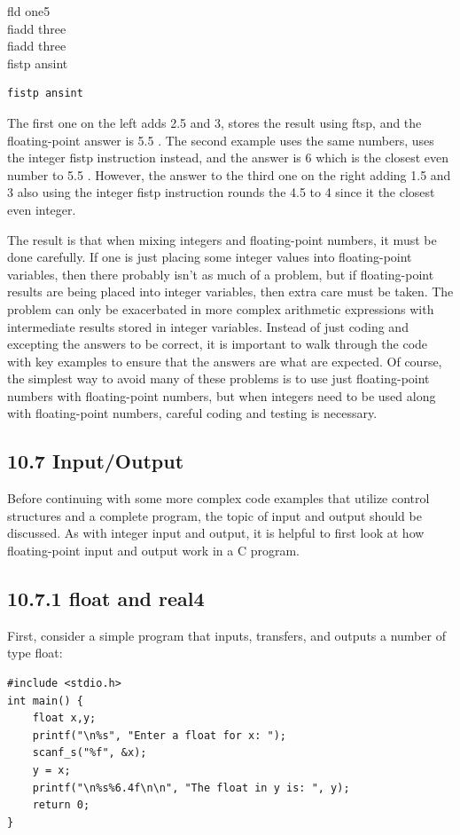 \documentclass[10pt]{book}
\begin{document}
\begin{center}
\begin{center}
\begin{center}
\begin{center}
fld one5\\
fiadd three\\
fiadd three\\
fistp ansint

\begin{verbatim}
fistp ansint
\end{verbatim}

The first one on the left adds 2.5 and 3, stores the result using ftsp, and the floating-point answer is 5.5 . The second example uses the same numbers, uses the integer fistp instruction instead, and the answer is 6 which is the closest even number to 5.5 . However, the answer to the third one on the right adding 1.5 and 3 also using the integer fistp instruction rounds the 4.5 to 4 since it the closest even integer.

The result is that when mixing integers and floating-point numbers, it must be done carefully. If one is just placing some integer values into floating-point variables, then there probably isn't as much of a problem, but if floating-point results are being placed into integer variables, then extra care must be taken. The problem can only be exacerbated in more complex arithmetic expressions with intermediate results stored in integer variables. Instead of just coding and excepting the answers to be correct, it is important to walk through the code with key examples to ensure that the answers are what are expected. Of course, the simplest way to avoid many of these problems is to use just floating-point numbers with floating-point numbers, but when integers need to be used along with floating-point numbers, careful coding and testing is necessary.

\subsection*{10.7 Input/Output}
Before continuing with some more complex code examples that utilize control structures and a complete program, the topic of input and output should be discussed. As with integer input and output, it is helpful to first look at how floating-point input and output work in a C program.

\subsection*{10.7.1 float and real4}
First, consider a simple program that inputs, transfers, and outputs a number of type float:


\begin{verbatim}
#include <stdio.h>
int main() {
    float x,y;
    printf("\n%s", "Enter a float for x: ");
    scanf_s("%f", &x);
    y = x;
    printf("\n%s%6.4f\n\n", "The float in y is: ", y);
    return 0;
}
\end{verbatim}


\end{center}
\end{center}
\end{center}
\end{center}
\end{document}
